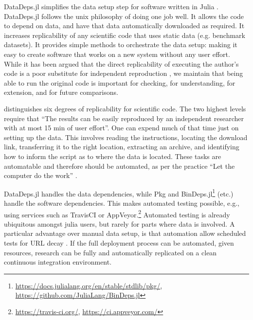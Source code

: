 \documentclass[twoside,11pt]{article}
\begin{document}
DataDeps.jl simplifies the data setup step for software written in Julia \citep{Julia}.
DataDeps.jl follows the unix philosophy of doing one job well.
It allows the code to depend on data, and have that data automatically downloaded as required.
It increases replicability of any scientific code that uses static data (e.g. benchmark datasets).
It provides simple methods to orchestrate the data setup: making it easy to create software that works on a new system without any user effort.
While it has been argued that the direct replicability of executing the author's code is a poor substitute for independent reproduction \citep{drummond2009replicability},
we maintain that being able to run the original code is important for checking, for understanding, for extension, and for future comparisons.


\citet{VabdewakkeReproduceableResearch} distinguishes six degrees of replicability for scientific code.
The two highest levels
require that ``The results can be easily reproduced by an independent researcher with at most 15 min of user effort''.
One can  expend much of that time just on setting up the data.
This involves reading the instructions, locating the download link, transferring it to the right location, extracting an archive, and identifying how to inform the script as to where the data is located.
These tasks are automatable and therefore should be automated, as per the practice  ``Let the computer do the work'' \citep{10.1371/journal.pbio.1001745}.


DataDeps.jl handles the data dependencies, while Pkg
 and BinDeps.jl\footnote{\url{https://docs.julialang.org/en/stable/stdlib/pkg/}, \url{https://github.com/JuliaLang/BinDeps.jl}}
 (etc.) handle the software dependencies.
This makes automated testing possible, e.g., using services such as 
TravisCI or AppVeyor.\footnote{\url{https://travis-ci.org/}, \url{https://ci.appveyor.com/}}
Automated testing is already ubiquitous amongst julia users, but rarely for parts where data is involved.
A particular advantage over manual data setup, is that automation allow scheduled tests for URL decay \citep{wren2008url}.
If the full deployment process can be automated, given resources, research can be fully and automatically replicated on a clean continuous integration environment.
\end{document}

